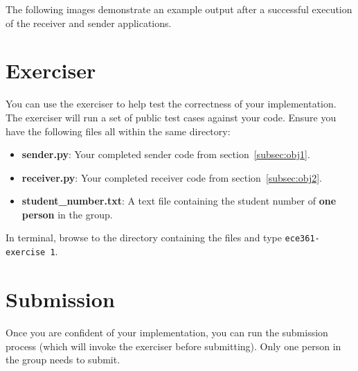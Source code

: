 \documentclass[11pt]{article}
\def\thelab{1}
\begin{document}

The following images demonstrate an example output after a successful execution of the receiver and sender applications.


\section{Exerciser}
\label{sec:exerciser}
You can use the exerciser to help test the correctness of your implementation. The exerciser will run a set of public test cases against your code.
Ensure you have the following files all within the same directory:
\begin{itemize}
    \item \textbf{sender.py}: Your completed sender code from section~\ref{subsec:obj1}.
    \item \textbf{receiver.py}: Your completed receiver code from section~\ref{subsec:obj2}.
    \item \textbf{student\_number.txt}: A text file containing the student number of \textbf{one person} in the group.
\end{itemize}

In terminal, browse to the directory containing the files and type \texttt{ece361-exercise \thelab}.

\section{Submission}
\label{sec:submission}
Once you are confident of your implementation, you can run the submission process (which will invoke the exerciser before submitting). Only one person in the group needs to submit.
\end{document}
